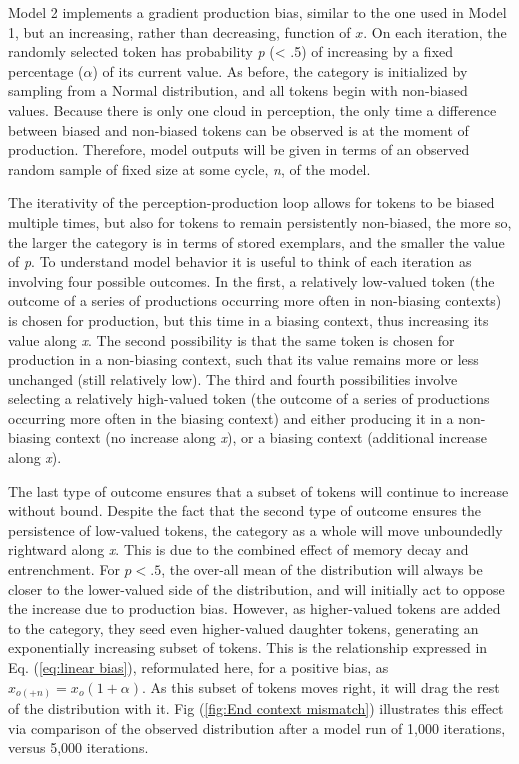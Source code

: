 Model 2 implements a gradient production bias, similar to the one
used in Model 1, but an increasing, rather than decreasing, function
of $x$. On each iteration, the randomly selected token has probability
\emph{p} (< .5) of increasing by a fixed percentage ($\alpha$) of
its current value. As before, the category is initialized by sampling
from a Normal distribution, and all tokens begin with non-biased values.
Because there is only one cloud in perception, the only time a difference
between biased and non-biased tokens can be observed is at the moment
of production. Therefore, model outputs will be given in terms of
an observed random sample of fixed size at some cycle, \emph{n}, of
the model.

The iterativity of the perception-production loop allows for tokens
to be biased multiple times, but also for tokens to remain persistently
non-biased, the more so, the larger the category is in terms of stored
exemplars, and the smaller the value of \emph{p}. To understand model
behavior it is useful to think of each iteration as involving four
possible outcomes. In the first, a relatively low-valued token (the
outcome of a series of productions occurring more often in non-biasing
contexts) is chosen for production, but this time in a biasing context,
thus increasing its value along \emph{x}. The second possibility is
that the same token is chosen for production in a non-biasing context,
such that its value remains more or less unchanged (still relatively
low). The third and fourth possibilities involve selecting a relatively
high-valued token (the outcome of a series of productions occurring
more often in the biasing context) and either producing it in a non-biasing
context (no increase along \emph{x}), or a biasing context (additional
increase along \emph{x}). 

The last type of outcome ensures that a subset of tokens will continue
to increase without bound. Despite the fact that the second type of
outcome ensures the persistence of low-valued tokens, the category
as a whole will move unboundedly rightward along \emph{x}. This is
due to the combined effect of memory decay and entrenchment. For $p<.5$,
the over-all mean of the distribution will always be closer to the
lower-valued side of the distribution, and will initially act to oppose
the increase due to production bias. However, as higher-valued tokens
are added to the category, they seed even higher-valued daughter tokens,
generating an exponentially increasing subset of tokens. This is the
relationship expressed in Eq. (\ref{eq:linear bias}), reformulated
here, for a positive bias, as $x_{o(+n)}=x_{o}(1+\alpha)$. As this
subset of tokens moves right, it will drag the rest of the distribution
with it. Fig (\ref{fig:End context mismatch}) illustrates this effect
via comparison of the observed distribution after a model run of 1,000
iterations, versus 5,000 iterations.


